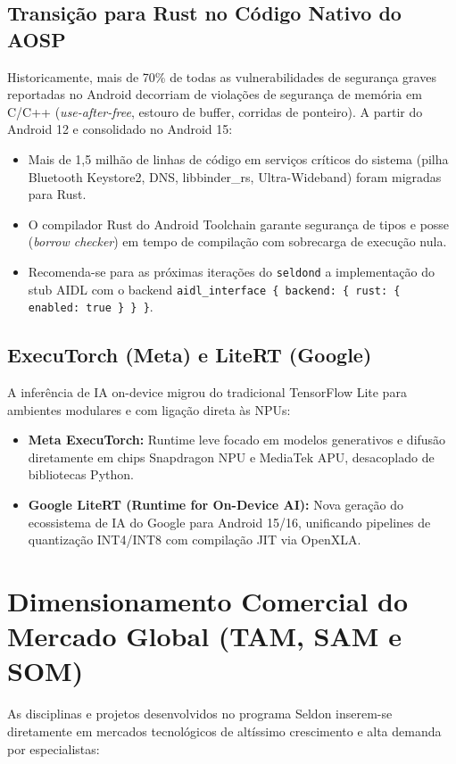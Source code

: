 \subsection{Transição para Rust no Código Nativo do AOSP}
Historicamente, mais de 70\% de todas as vulnerabilidades de segurança graves reportadas no Android decorriam de violações de segurança de memória em C/C++ (\textit{use-after-free}, estouro de buffer, corridas de ponteiro). A partir do Android 12 e consolidado no Android 15:
\begin{itemize}
    \item Mais de 1,5 milhão de linhas de código em serviços críticos do sistema (pilha Bluetooth Keystore2, DNS, libbinder\_rs, Ultra-Wideband) foram migradas para Rust.
    \item O compilador Rust do Android Toolchain garante segurança de tipos e posse (\textit{borrow checker}) em tempo de compilação com sobrecarga de execução nula.
    \item Recomenda-se para as próximas iterações do \texttt{seldond} a implementação do stub AIDL com o backend \texttt{aidl\_interface \{ backend: \{ rust: \{ enabled: true \} \} \}}.
\end{itemize}

\subsection{ExecuTorch (Meta) e LiteRT (Google)}
A inferência de IA on-device migrou do tradicional TensorFlow Lite para ambientes modulares e com ligação direta às NPUs:
\begin{itemize}
    \item \textbf{Meta ExecuTorch:} Runtime leve focado em modelos generativos e difusão diretamente em chips Snapdragon NPU e MediaTek APU, desacoplado de bibliotecas Python.
    \item \textbf{Google LiteRT (Runtime for On-Device AI):} Nova geração do ecossistema de IA do Google para Android 15/16, unificando pipelines de quantização INT4/INT8 com compilação JIT via OpenXLA.
\end{itemize}

\section{Dimensionamento Comercial do Mercado Global (TAM, SAM e SOM)}

As disciplinas e projetos desenvolvidos no programa Seldon inserem-se diretamente em mercados tecnológicos de altíssimo crescimento e alta demanda por especialistas:

